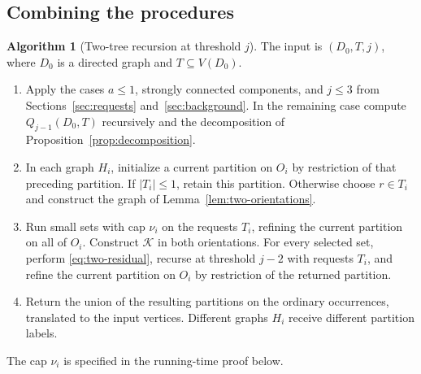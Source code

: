 \documentclass[11pt]{article}
\theoremstyle{definition}
\newtheorem{algorithm}[theorem]{Algorithm}
\theoremstyle{remark}
\begin{document}
\subsection{Combining the procedures}
\begin{algorithm}[Two-tree recursion at threshold \(j\)]
\label{alg:slow}
The input is \((D_0,T,j)\), where \(D_0\) is a directed graph and \(T\subseteq V(D_0)\).
\begin{enumerate}
\item Apply the cases \(a\le1\), strongly connected components, and \(j\le3\) from Sections~\ref{sec:requests} and~\ref{sec:background}. In the remaining case compute \(Q_{j-1}(D_0,T)\) recursively and the decomposition of Proposition~\ref{prop:decomposition}.
\item In each graph \(H_i\), initialize a current partition on \(O_i\) by restriction of that preceding partition. If \(|T_i|\le1\), retain this partition. Otherwise choose \(r\in T_i\) and construct the graph of Lemma~\ref{lem:two-orientations}.
\item Run small sets with cap \(\nu_i\) on the requests \(T_i\), refining the current partition on all of \(O_i\). Construct \(\mathcal K\) in both orientations. For every selected set, perform \eqref{eq:two-residual}, recurse at threshold \(j-2\) with requests \(T_i\), and refine the current partition on \(O_i\) by restriction of the returned partition.
\item Return the union of the resulting partitions on the ordinary occurrences, translated to the input vertices. Different graphs \(H_i\) receive different partition labels.
\end{enumerate}
The cap \(\nu_i\) is specified in the running-time proof below.
\end{algorithm}
\end{document}
